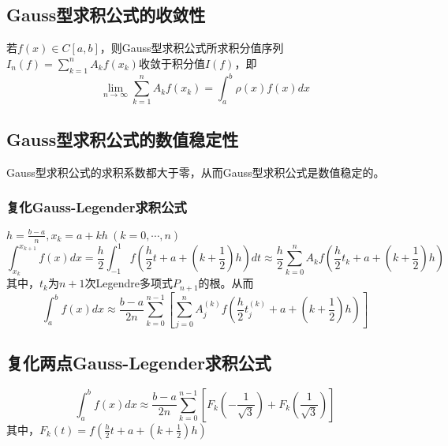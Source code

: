 \subsection{Gauss型求积公式的收敛性}

\begin{theorem}
    若$f(x) \in C[a,b]$，则Gauss型求积公式所求积分值序列${I_n(f) = \sum_{k=1}^{n}A_kf(x_k)}$收敛于积分值$I(f)$，即
    \begin{equation*}
        \lim_{n\rightarrow \infty}\sum_{k=1}^{n}A_kf(x_k) = \int_{a}^{b}\rho(x)f(x)dx
    \end{equation*}
\end{theorem}

\subsection{Gauss型求积公式的数值稳定性}

\begin{theorem}
    Gauss型求积公式的求积系数都大于零，从而Gauss型求积公式是数值稳定的。
\end{theorem}

\subsubsection{复化Gauss-Legender求积公式}

$h = \frac{b-a}{n},x_k = a+kh \   (k=0,\cdots ,n)$
\begin{equation*}
    \int_{x_k}^{x_{k+1}}f(x)dx = \frac{h}{2}\int_{-1}^{1}f(\frac{h}{2}t+a+(k+\frac{1}{2})h)dt \approx \frac{h}{2}\sum_{k=0}^{n}A_kf(\frac{h}{2}t_k+a+(k+\frac{1}{2})h)
\end{equation*}
其中，$t_k$为$n+1$次Legendre多项式$P_{n+1}$的根。从而
\begin{equation*}
    \int_{a}^{b}f(x)dx \approx \frac{b-a}{2n}\sum_{k=0}^{n-1}[\sum_{j=0}^{n}A_j^{(k)}f(\frac{h}{2}t_j^{(k)}+a+(k+\frac{1}{2})h)]
\end{equation*}

\subsection{复化两点Gauss-Legender求积公式}
\begin{equation*}
    \int_{a}^{b}f(x)dx \approx \frac{b-a}{2n}\sum_{k=0}^{n-1}[F_k(-\frac{1}{\sqrt{3}})+F_k(\frac{1}{\sqrt{3}})]
\end{equation*}
其中，$F_k(t) = f(\frac{h}{2}t+a+(k+\frac{1}{2})h)$

